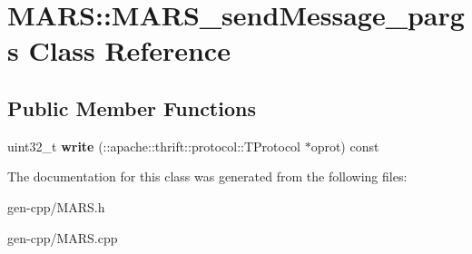\hypertarget{classMARS_1_1MARS__sendMessage__pargs}{}\section{M\+A\+RS\+:\+:M\+A\+R\+S\+\_\+send\+Message\+\_\+pargs Class Reference}
\label{classMARS_1_1MARS__sendMessage__pargs}
\subsection*{Public Member Functions}
\begin{DoxyCompactItemize}
\item 
\mbox{\label{classMARS_1_1MARS__sendMessage__pargs_a2ac4098bf01d6d366b1e607dbc4eeb30}} 
uint32\+\_\+t {\bfseries write} (\+::apache\+::thrift\+::protocol\+::\+T\+Protocol $\ast$oprot) const
\end{DoxyCompactItemize}


The documentation for this class was generated from the following files\+:\begin{DoxyCompactItemize}
\item 
gen-\/cpp/M\+A\+R\+S.\+h\item 
gen-\/cpp/M\+A\+R\+S.\+cpp\end{DoxyCompactItemize}
